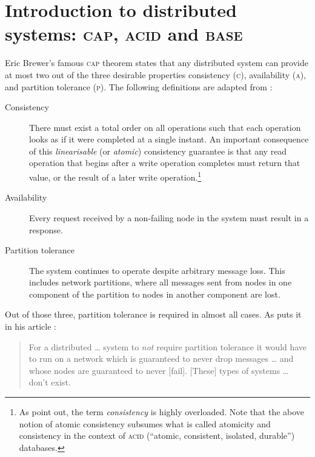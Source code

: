 \documentclass[11pt,chapterprefix=true,toc=bibliography,numbers=noendperiod,
               footnotes=multiple,twoside]{scrreprt}
\begin{document}
\section[Introduction to distributed systems]{Introduction to distributed systems: \textsc{cap}, \textsc{acid} and \textsc{base}\label{ssc:cap-acid-and-base}}

Eric Brewer's famous \textsc{cap} theorem states that any distributed system can provide at most two out of the three desirable properties consistency (\textsc{c}), availability (\textsc{a}), and partition tolerance (\textsc{p}).\autocite{cap} The following definitions are adapted from \textcite{capproof}:

\begin{description}
    \item[Consistency] There must exist a total order on all operations such that each operation looks as if it were completed at a single instant. An important consequence of this \emph{linearisable} (or \emph{atomic}) consistency guarantee is that any read operation that begins after a write operation completes must return that value, or the result of a later write operation.\footnote{As \textcite{capproof} point out, the term \emph{consistency} is highly overloaded. Note that the above notion of atomic consistency subsumes what is called atomicity and consistency in the context of \textsc{acid} (\enquote{atomic, consistent, isolated, durable}) databases.}
    \item[Availability] Every request received by a non-failing node in the system must result in a response.
    \item[Partition tolerance] The system continues to operate despite arbitrary message loss. This includes network partitions, where all messages sent from nodes in one component of the partition to nodes in another component are lost.
\end{description}

Out of those three, partition tolerance is required in almost all cases. As \citeauthor{needp} puts it in his article :

\begin{quote}
    For a distributed \dots{} system to \emph{not} require partition tolerance it would have to run on a network which is guaranteed to never drop messages \dots{} and whose nodes are guaranteed to never [fail]. [These] types of systems \dots{} don't exist.
\end{quote}
\end{document}
